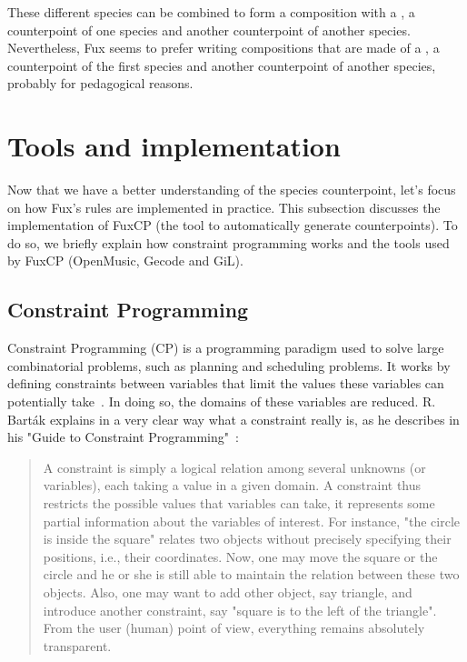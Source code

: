 These different species can be combined to form a composition with a \cf, a counterpoint of one species and another counterpoint of another species. Nevertheless, Fux seems to prefer writing compositions that are made of a \cf, a counterpoint of the first species and another counterpoint of another species, probably for pedagogical reasons.

\section{Tools and implementation}\label{subsection:tools-and-implementation}
Now that we have a better understanding of the species counterpoint, let's focus on how Fux's rules are implemented in practice.
This subsection discusses the implementation of FuxCP (the tool to automatically generate counterpoints). To do so, we briefly explain how constraint programming works and the tools used by FuxCP (OpenMusic, Gecode and GiL).

\subsection{Constraint Programming}
Constraint Programming (CP) is a programming paradigm used to solve large combinatorial problems, such as planning and scheduling problems. It works by defining constraints between variables that limit the values these variables can potentially take~\cite{rossi2008constraint}. In doing so, the domains of these variables are reduced. R. Barták explains in a very clear way what a constraint really is, as he describes in his "Guide to Constraint Programming"~\cite{bartak1998constraint}:

\begin{quote}
    A constraint is simply a logical relation among several unknowns (or variables), each taking a value in a given domain. A constraint thus restricts the possible values that variables can take, it represents some partial information about the variables of interest. For instance, "the circle is inside the square" relates two objects without precisely specifying their positions, i.e., their coordinates. Now, one may move the square or the circle and he or she is still able to maintain the relation between these two objects. Also, one may want to add other object, say triangle, and introduce another constraint, say "square is to the left of the triangle". From the user (human) point of view, everything remains absolutely transparent.
\end{quote}

